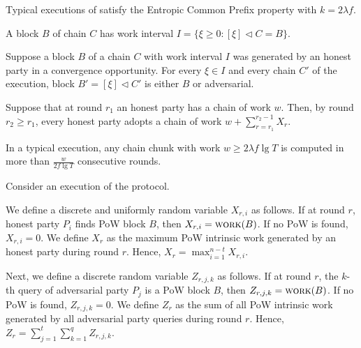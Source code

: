 \begin{conjecture}
  Typical executions of \poem satisfy the Entropic Common Prefix property
  with $k = 2 \lambda f$.
\end{conjecture}

\begin{definition}
  A block $B$ of chain $C$ has work interval
  $I = \{\xi \geq 0: [\xi] \lhd C = B\}$.
\end{definition}


\begin{conjecture}
  Suppose a block $B$ of a chain $C$ with work interval $I$
  was generated by an honest party in a convergence opportunity.
  For every $\xi \in I$ and every chain $C'$ of the execution,
  block $B' = [\xi] \lhd C'$ is either $B$ or adversarial.
\end{conjecture}

\begin{conjecture}
  Suppose that at round $r_1$ an honest party has a chain of work $w$.
  Then, by round $r_2 \geq r_1$, every honest party adopts a chain of work
  $w + \sum_{r = r_1}^{r_2 - 1}{X_r}$.
\end{conjecture}


\begin{conjecture}
  In a typical execution, any chain chunk with work $w \geq 2 \lambda f \lg T$ is computed
  in more than $\frac{w}{2 f \lg T}$ consecutive rounds.
\end{conjecture}


Consider an execution of the \poem protocol.

We define a discrete and uniformly random variable $X_{r, i}$ as follows.
If at round $r$, honest party $P_i$ finds PoW block $B$, then $X_{r, i} = \textsc{work}(B)$.
If no PoW is found, $X_{r, i} = 0$. We define $X_{r}$ as the maximum PoW intrinsic work
generated by an honest party during round $r$. Hence, $X_{r} = \max_{i = 1}^{n - t}{X_{r,i}}$.

Next, we define a discrete random variable $Z_{r, j, k}$ as follows.
If at round $r$, the $k$-th query of adversarial party $P_j$ is a PoW block $B$, then
$Z_{r, j, k} = \textsc{work}(B)$. If no PoW is found, $Z_{r, j, k} = 0$. We define $Z_{r}$ as
the sum of all PoW intrinsic work generated by all adversarial party queries
during round $r$. Hence, $Z_{r} = \sum_{j = 1}^{t}{ \sum_{k = 1}^{q}{ Z_{r, j, k} } }$.

